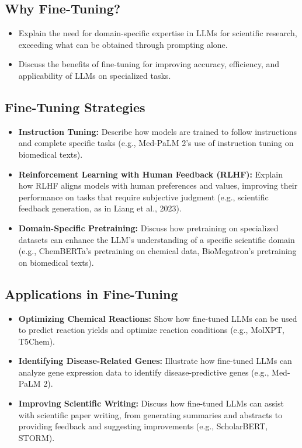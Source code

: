 \documentclass{article}
\begin{document}
\subsection{Why Fine-Tuning?}
\begin{itemize}
    \item Explain the need for domain-specific expertise in LLMs for scientific research, exceeding what can be obtained through prompting alone.
    \item Discuss the benefits of fine-tuning for improving accuracy, efficiency, and applicability of LLMs on specialized tasks.
\end{itemize}

\subsection{Fine-Tuning Strategies}
\begin{itemize}
    \item \textbf{Instruction Tuning:} Describe how models are trained to follow instructions and complete specific tasks (e.g., Med-PaLM 2's use of instruction tuning on biomedical texts).
    \item \textbf{Reinforcement Learning with Human Feedback (RLHF):} Explain how RLHF aligns models with human preferences and values, improving their performance on tasks that require subjective judgment (e.g., scientific feedback generation, as in Liang et al., 2023).
    \item \textbf{Domain-Specific Pretraining:} Discuss how pretraining on specialized datasets can enhance the LLM's understanding of a specific scientific domain (e.g., ChemBERTa's pretraining on chemical data, BioMegatron's pretraining on biomedical texts).
\end{itemize}

\subsection{Applications in Fine-Tuning}
\begin{itemize}
    \item \textbf{Optimizing Chemical Reactions:} Show how fine-tuned LLMs can be used to predict reaction yields and optimize reaction conditions (e.g., MolXPT, T5Chem).
    \item \textbf{Identifying Disease-Related Genes:} Illustrate how fine-tuned LLMs can analyze gene expression data to identify disease-predictive genes (e.g., Med-PaLM 2).
    \item \textbf{Improving Scientific Writing:} Discuss how fine-tuned LLMs can assist with scientific paper writing, from generating summaries and abstracts to providing feedback and suggesting improvements (e.g., ScholarBERT, STORM).
\end{itemize}
\end{document}
